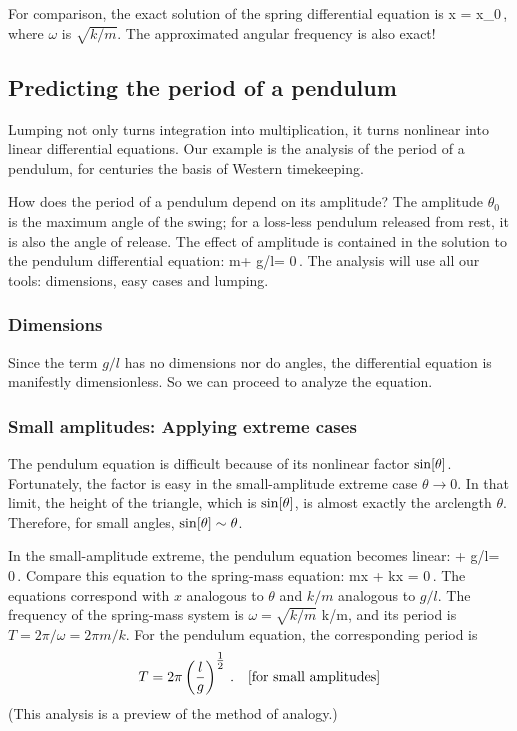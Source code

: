 For comparison, the exact solution of the spring differential equation is
\beq
x = x_0\cos{}\,,
\eeq
where $\omega$ is $\sqrt{k/m}$. The approximated angular frequency is also exact!


\subsection{Predicting the period of a pendulum}
Lumping not only turns integration into multiplication, it turns nonlinear into linear differential equations. Our example is the analysis of the period of a pendulum, for centuries the basis of Western timekeeping.

How does the period of a pendulum depend on its amplitude? The amplitude $\theta_0$ is the maximum angle of the swing; for a loss-less pendulum released from rest, it is also the angle of release. The effect of amplitude is contained in the solution to the pendulum differential equation:
\beq
m\ddt\theta + g/l\sin\vat\theta = 0\,.
\eeq
The analysis will use all our tools: dimensions, easy cases and lumping.


\subsubsection{Dimensions}
Since the term $g/l$ has no dimensions nor do angles, the differential equation is manifestly dimensionless. So we can proceed to analyze the equation.


\subsubsection{Small amplitudes: Applying extreme cases}
The pendulum equation is difficult because of its nonlinear factor $\sin\!\left[{\theta}\right]$. Fortunately, the factor is easy in the small-amplitude extreme case $\theta\to 0$. In that limit, the height of the triangle, which is $\sin\!\left[{\theta}\right]$, is almost exactly the arclength $\theta$. Therefore, for small angles, $\sin\!\left[{\theta}\right]\sim\theta$.

In the small-amplitude extreme, the pendulum equation becomes linear:
\beq
\ddt\theta + g/l\theta = 0\,.
\eeq
Compare this equation to the spring-mass equation:
\beq
m\ddt x + kx = 0\,.
\eeq
The equations correspond with $x$ analogous to $\theta$ and $k/m$ analogous to $g/l$. The frequency of the spring-mass system is $\omega = \sqrt{k/m}$ k/m, and its period is $T = 2\pi/\omega = 2\pi m/k$. For the pendulum equation, the corresponding period is
\begin{align*}
T &= 2\pi\left({\dfrac{l}{g}}\right)^{\tfrac{1}{2}}\,. &\text{[{for small amplitudes}]}
\end{align*}
(This analysis is a preview of the method of analogy.)


